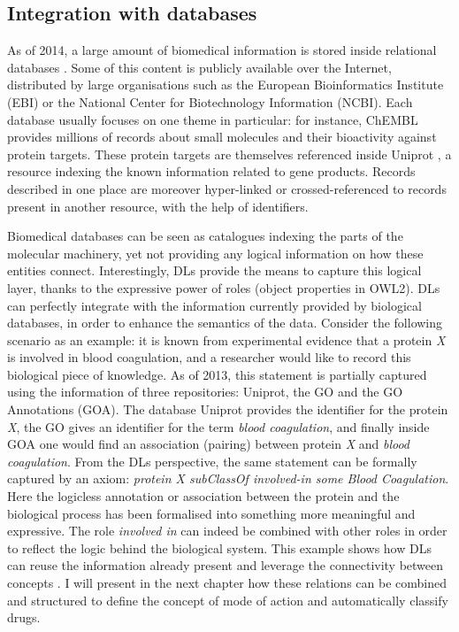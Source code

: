 \subsection{Integration with databases}

As of 2014, a large amount of biomedical information is stored inside relational databases \citep{brooksbank2014european}. Some of this content is publicly available over the Internet, distributed by large organisations such as the European Bioinformatics Institute (EBI) or the National Center for Biotechnology Information (NCBI). Each database usually focuses on one theme in particular: for instance, ChEMBL \citep{gaulton2012chembl} provides millions of records about small molecules and their bioactivity against protein targets. These protein targets are themselves referenced inside Uniprot \citep{uniprot2013update}, a resource indexing the known information related to gene products. Records described in one place are moreover hyper-linked or crossed-referenced to records present in another resource, with the help of identifiers.

Biomedical databases can be seen as catalogues indexing the parts of the molecular machinery, yet not providing any logical information on how these entities connect. Interestingly, DLs provide the means to capture this logical layer, thanks to the expressive power of roles (object properties in OWL2). DLs can perfectly integrate with the information currently provided by biological databases, in order to enhance the semantics of the data. Consider the following scenario as an example: it is known from experimental evidence that a protein \emph{X} is involved in blood coagulation, and a researcher would like to record this biological piece of knowledge. As of 2013, this statement is partially captured using the information of three repositories: Uniprot, the GO and the GO Annotations (GOA). The database Uniprot provides the identifier for the protein \emph{X}, the GO gives an identifier for the term \emph{blood coagulation}, and finally inside GOA one would find an association (pairing) between protein \emph{X} and \emph{blood coagulation}. From the DLs perspective, the same statement can be formally captured by an axiom: \emph{protein X subClassOf involved-in some Blood Coagulation}. Here the logicless annotation or association between the protein and the biological process has been formalised into something more meaningful and expressive. The role \emph{involved in} can indeed be combined with other roles in order to reflect the logic behind the biological system. This example shows how DLs can reuse the information already present and leverage the connectivity between concepts \citep{jupp2012logical}. I will present in the next chapter how these relations can be combined and structured to define the concept of mode of action and automatically classify drugs.


